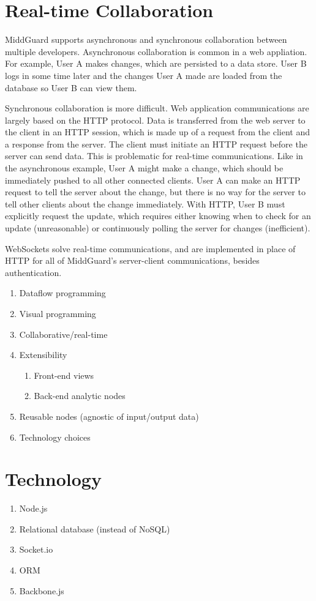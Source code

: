 \documentclass[midd]{thesis}
\begin{document}
\section{Real-time Collaboration}

MiddGuard supports asynchronous and synchronous collaboration between multiple
developers. Asynchronous collaboration is common in a web appliation. For
example, User A makes changes, which are persisted to a data store. User B logs
in some time later and the changes User A made are loaded from the database so
User B can view them.

Synchronous collaboration is more difficult. Web application communications are
largely based on the HTTP protocol. Data is transferred from the web server to
the client in an HTTP session, which is made up of a request from the client and
a response from the server. The client must initiate an HTTP request before the
server can send data. This is problematic for real-time communications. Like in
the asynchronous example, User A might make a change, which should be
immediately pushed to all other connected clients. User A can make an HTTP
request to tell the server about the change, but there is no way for the server
to tell other clients about the change immediately. With HTTP, User B must
explicitly request the update, which requires either knowing when to check for
an update (unreasonable) or continuously polling the server for changes
(inefficient).

WebSockets solve real-time communications, and are implemented in place of HTTP for all of MiddGuard's server-client communications, besides authentication.

  \begin{enumerate}
    \item Dataflow programming
    \item Visual programming
    \item Collaborative/real-time
    \item Extensibility
    \begin{enumerate}
      \item Front-end views
      \item Back-end analytic nodes
    \end{enumerate}
    \item Reusable nodes (agnostic of input/output data)
    \item Technology choices
  \end{enumerate}

\section{Technology}
  \begin{enumerate}
    \item Node.js
    \item Relational database (instead of NoSQL)
    \item Socket.io
    \item ORM
    \item Backbone.js
  \end{enumerate}
\end{document}
